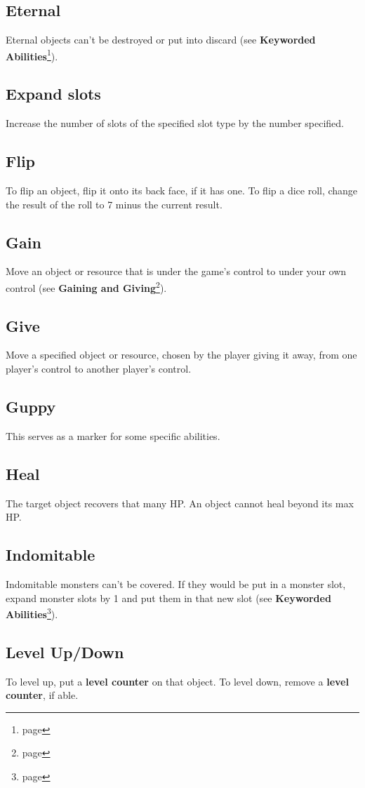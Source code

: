 \documentclass[a4paper, twoside]{report} %
\begin{document}
    \subsection*{Eternal}
    Eternal objects can’t be destroyed or put into discard (see \textbf{Keyworded Abilities}\footnote{page \pageref{keyworded}}).
    \subsection*{Expand slots}
    Increase the number of slots of the specified slot type by the number specified.
    \subsection*{Flip}
    To flip an object, flip it onto its back face, if it has one. To flip a dice roll, change the result of the roll to 7 minus the current result.
    \subsection*{Gain}
    Move an object or resource that is under the game’s control to under your own control (see \textbf{Gaining and Giving}\footnote{page \pageref{gaining}}).
    \subsection*{Give}
    Move a specified object or resource, chosen by the player giving it away, from one player’s control to another player’s control.
    \subsection*{Guppy}
    This serves as a marker for some specific abilities.
    \subsection*{Heal}
    The target object recovers that many HP. An object cannot heal beyond its max HP.
    \subsection*{Indomitable}
    Indomitable monsters can’t be covered. If they would be put in a monster slot, expand monster slots by 1 and put them in that new slot (see \textbf{Keyworded Abilities}\footnote{page \pageref{keyworded}}).
    \subsection*{Level Up/Down}
    To level up, put a \textbf{level counter} on that object. To level down, remove a \textbf{level counter}, if able.
\end{document}
